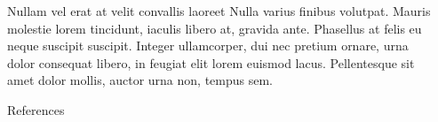 \documentclass[final]{beamer}
\newlength{\sepwidth}
\newlength{\colwidth}
\newcommand{\separatorcolumn}{\begin{column}{\sepwidth}\end{column}}
\begin{document}
\begin{frame}[t]
\begin{columns}[t]
\begin{column}{\colwidth}
\begin{block}{Nullam vel erat at velit convallis laoreet}
				Nulla varius finibus volutpat. Mauris molestie lorem tincidunt, iaculis
				libero at, gravida ante. Phasellus at felis eu neque suscipit suscipit.
				Integer ullamcorper, dui nec pretium ornare, urna dolor consequat libero,
				in feugiat elit lorem euismod lacus. Pellentesque sit amet dolor mollis,
				auctor urna non, tempus sem.
				
			\end{block}
			
			
			\begin{block}{References}
				\printbibliography[heading=none]
			\end{block}
		\end{column}
		
		\separatorcolumn
	\end{columns}
\end{frame}
\end{document}
